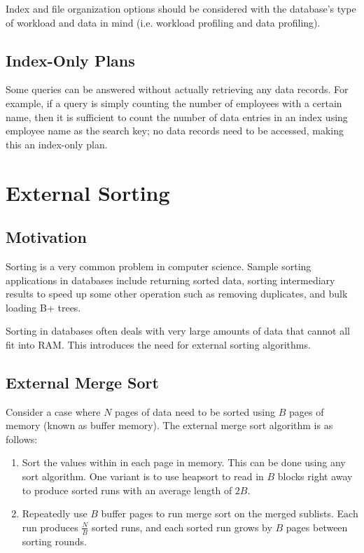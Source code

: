 \documentclass[12pt,titlepage]{article}
\let\stdsection\section
\renewcommand\section{\clearpage\stdsection}
\begin{document}
      Index and file organization options should be considered with the database's type of workload and data in mind (i.e. workload profiling and
      data profiling).

    \subsection{Index-Only Plans}
      Some queries can be answered without actually retrieving any data records. For example, if a query is simply counting the number of employees
      with a certain name, then it is sufficient to count the number of data entries in an index using employee name as the search key; no data records
      need to be accessed, making this an index-only plan.

  \section{External Sorting}

    \subsection{Motivation}
      Sorting is a very common problem in computer science. Sample sorting applications in databases include returning sorted data, sorting intermediary
      results to speed up some other operation such as removing duplicates, and bulk loading B+ trees.

      Sorting in databases often deals with very large amounts of data that cannot all fit into RAM. This introduces the need for external sorting algorithms.

    \subsection{External Merge Sort}
      Consider a case where $N$ pages of data need to be sorted using $B$ pages of memory (known as buffer memory). The external merge sort algorithm is as
      follows:

      \begin{enumerate}
        \item Sort the values within in each page in memory. This can be done using any sort algorithm. One variant is to use heapsort to read in $B$ blocks
          right away to produce sorted runs with an average length of $2B$.
        \item Repeatedly use $B$ buffer pages to run merge sort on the merged sublists. Each run produces $\frac{N}{B}$ sorted runs, and each sorted run grows
          by $B$ pages between sorting rounds.
      \end{enumerate}
\end{document}
